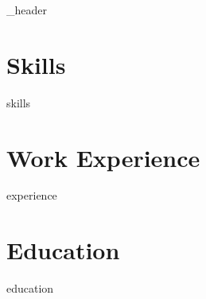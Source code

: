 \documentclass[letter,10pt]{article}
\author{Ilya Kazakov}
\begin{document}
{_header}
\vspace*{10pt}

\section{Skills}

\vspace*{3pt}
{skills}
\vspace*{10pt}


\section{Work Experience}
\vspace*{3pt}
{experience}
\vspace*{10pt}

\section{Education}
{education}
\vspace*{10pt}
\end{document}
